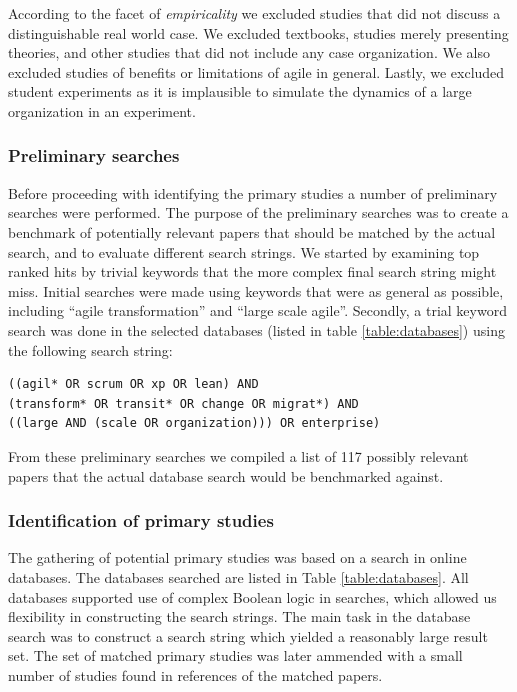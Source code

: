 \documentclass[preprint,authoryear,12pt]{elsarticle}
\begin{document}

According to the facet of \emph{empiricality} we excluded studies that did not
discuss a distinguishable real world case. We excluded textbooks, studies merely
presenting theories, and other studies that did not include any case
organization. We also excluded studies of benefits or limitations of agile in
general. Lastly, we excluded student experiments as it is implausible to
simulate the dynamics of a large organization in an experiment.


\subsubsection{Preliminary searches}

Before proceeding with identifying the primary studies a number of preliminary
searches were performed. The purpose of the preliminary searches was to create a
benchmark of potentially relevant papers that should be matched by the actual
search, and to evaluate different search strings. We started by examining top
ranked hits by trivial keywords that the more complex final search string might
miss. Initial searches were made using keywords that were as general as
possible, including ``agile transformation'' and ``large scale agile''.
Secondly, a trial keyword search was done in the selected databases (listed in
table \ref{table:databases}) using the following search string:

\begin{verbatim}
((agil* OR scrum OR xp OR lean) AND
(transform* OR transit* OR change OR migrat*) AND
((large AND (scale OR organization))) OR enterprise)
\end{verbatim}

From these preliminary searches we compiled a list of 117 possibly relevant
papers that the actual database search would be benchmarked against.


\subsubsection{Identification of primary studies}

The gathering of potential primary studies was based on a search in online
databases. The databases searched are listed in Table \ref{table:databases}. All
databases supported use of complex Boolean logic in searches, which allowed us
flexibility in constructing the search strings. The main task in the database
search was to construct a search string which yielded a reasonably large result
set. The set of matched primary studies was later ammended with a small number
of studies found in references of the matched papers.
\end{document}
